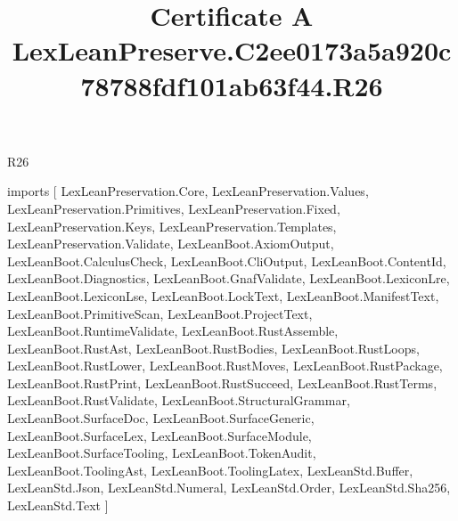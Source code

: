 \begin{lexlean}{R26}
\title{Certificate A LexLeanPreserve.C2ee0173a5a920c78788fdf101ab63f44.R26}
\begin{coremodule}
imports [
  LexLeanPreservation.Core,
  LexLeanPreservation.Values,
  LexLeanPreservation.Primitives,
  LexLeanPreservation.Fixed,
  LexLeanPreservation.Keys,
  LexLeanPreservation.Templates,
  LexLeanPreservation.Validate,
  LexLeanBoot.AxiomOutput,
  LexLeanBoot.CalculusCheck,
  LexLeanBoot.CliOutput,
  LexLeanBoot.ContentId,
  LexLeanBoot.Diagnostics,
  LexLeanBoot.GnafValidate,
  LexLeanBoot.LexiconLre,
  LexLeanBoot.LexiconLse,
  LexLeanBoot.LockText,
  LexLeanBoot.ManifestText,
  LexLeanBoot.PrimitiveScan,
  LexLeanBoot.ProjectText,
  LexLeanBoot.RuntimeValidate,
  LexLeanBoot.RustAssemble,
  LexLeanBoot.RustAst,
  LexLeanBoot.RustBodies,
  LexLeanBoot.RustLoops,
  LexLeanBoot.RustLower,
  LexLeanBoot.RustMoves,
  LexLeanBoot.RustPackage,
  LexLeanBoot.RustPrint,
  LexLeanBoot.RustSucceed,
  LexLeanBoot.RustTerms,
  LexLeanBoot.RustValidate,
  LexLeanBoot.StructuralGrammar,
  LexLeanBoot.SurfaceDoc,
  LexLeanBoot.SurfaceGeneric,
  LexLeanBoot.SurfaceLex,
  LexLeanBoot.SurfaceModule,
  LexLeanBoot.SurfaceTooling,
  LexLeanBoot.TokenAudit,
  LexLeanBoot.ToolingAst,
  LexLeanBoot.ToolingLatex,
  LexLeanStd.Buffer,
  LexLeanStd.Json,
  LexLeanStd.Numeral,
  LexLeanStd.Order,
  LexLeanStd.Sha256,
  LexLeanStd.Text
]


\end{coremodule}
\end{lexlean}
